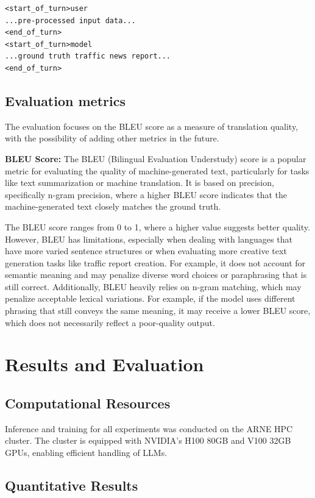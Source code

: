 \documentclass[fleqn,moreauthors,10pt]{ds_report}
\begin{document}
\begin{verbatim}
<start_of_turn>user
...pre-processed input data...
<end_of_turn>
<start_of_turn>model
...ground truth traffic news report...
<end_of_turn>
\end{verbatim}

\subsection*{Evaluation metrics}

The evaluation focuses on the BLEU score as a measure of translation quality, with the possibility of adding other metrics in the future.

\noindent \textbf{BLEU Score:} The BLEU (Bilingual Evaluation Understudy) score is a popular metric for evaluating the quality of machine-generated text, particularly for tasks like text summarization or machine translation. It is based on precision, specifically n-gram precision, where a higher BLEU score indicates that the machine-generated text closely matches the ground truth.

The BLEU score ranges from 0 to 1, where a higher value suggests better quality. However, BLEU has limitations, especially when dealing with languages that have more varied sentence structures or when evaluating more creative text generation tasks like traffic report creation. For example, it does not account for semantic meaning and may penalize diverse word choices or paraphrasing that is still correct. Additionally, BLEU heavily relies on n-gram matching, which may penalize acceptable lexical variations. For example, if the model uses different phrasing that still conveys the same meaning, it may receive a lower BLEU score, which does not necessarily reflect a poor-quality output.


\section{Results and Evaluation}

\subsection*{Computational Resources}

Inference and training for all experiments was conducted on the ARNE HPC cluster. The cluster is equipped with NVIDIA's H100 80GB and V100 32GB GPUs, enabling efficient handling of LLMs.

\subsection*{Quantitative Results}
\end{document}
